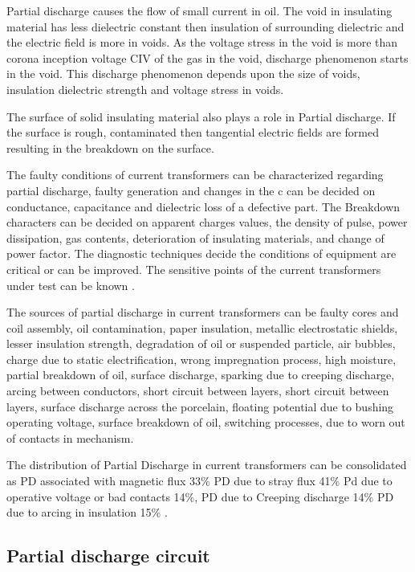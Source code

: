 Partial discharge causes the flow of small current in oil. The void in insulating material has less dielectric constant then insulation of surrounding dielectric and the electric field is more in voids. As the voltage stress in the void is more than corona inception voltage CIV of the gas in the void, discharge phenomenon starts in the void. This discharge phenomenon depends upon the size of voids, insulation dielectric strength and voltage stress in voids.

The surface of solid insulating material also plays a role in Partial discharge. If the surface is rough, contaminated then tangential electric fields are formed resulting in the breakdown on the surface.

The faulty conditions of current transformers can be characterized regarding partial discharge, faulty generation and changes in the c can be decided on conductance, capacitance and dielectric loss of a defective part. The Breakdown characters can be decided on apparent charges values, the density of pulse, power dissipation, gas contents, deterioration of insulating materials, and change of power factor. The diagnostic techniques decide the conditions of equipment are critical or can be improved. The sensitive points of the current transformers under test can be known \cite{chen2007rf, chen2008time}.

The sources of partial discharge in current transformers can be faulty cores and coil assembly, oil contamination, paper insulation, metallic electrostatic shields, lesser insulation strength, degradation of oil or suspended particle, air bubbles, charge due to static electrification, wrong impregnation process, high moisture, partial breakdown of oil, surface discharge, sparking due to creeping discharge, arcing between conductors, short circuit between layers, short circuit between layers, surface discharge across the porcelain, floating potential due to bushing operating voltage, surface breakdown of oil, switching processes, due to worn out of contacts in mechanism.

The distribution of Partial Discharge in current transformers can be consolidated as PD associated with magnetic flux 33\% PD due to stray flux 41\% Pd due to operative voltage or bad contacts 14\%, PD due to Creeping discharge 14\% PD due to arcing in insulation 15\% \setlength{\parskip}{0em}\cite{wang2006acousto, schwarz2007modern, kuchinsky1979partial}.

\subsection{Partial discharge circuit}

